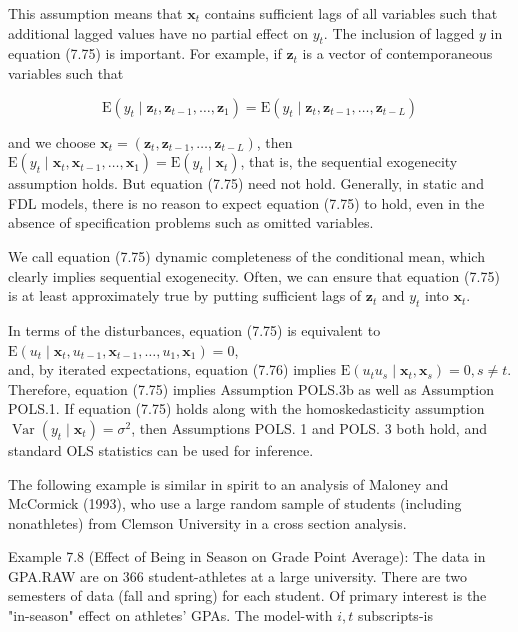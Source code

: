 \documentclass[10pt]{article}
\begin{document}
This assumption means that $\mathbf{x}_{t}$ contains sufficient lags of all variables such that additional lagged values have no partial effect on $y_{t}$. The inclusion of lagged $y$ in equation (7.75) is important. For example, if $\mathbf{z}_{t}$ is a vector of contemporaneous variables such that

$$
\mathrm{E}\left(y_{t} \mid \mathbf{z}_{t}, \mathbf{z}_{t-1}, \ldots, \mathbf{z}_{1}\right)=\mathrm{E}\left(y_{t} \mid \mathbf{z}_{t}, \mathbf{z}_{t-1}, \ldots, \mathbf{z}_{t-L}\right)
$$

and we choose $\mathbf{x}_{t}=\left(\mathbf{z}_{t}, \mathbf{z}_{t-1}, \ldots, \mathbf{z}_{t-L}\right)$, then $\mathrm{E}\left(y_{t} \mid \mathbf{x}_{t}, \mathbf{x}_{t-1}, \ldots, \mathbf{x}_{1}\right)=\mathrm{E}\left(y_{t} \mid \mathbf{x}_{t}\right)$, that is, the sequential exogenecity assumption holds. But equation (7.75) need not hold. Generally, in static and FDL models, there is no reason to expect equation (7.75) to hold, even in the absence of specification problems such as omitted variables.

We call equation (7.75) dynamic completeness of the conditional mean, which clearly implies sequential exogenecity. Often, we can ensure that equation (7.75) is at least approximately true by putting sufficient lags of $\mathbf{z}_{t}$ and $y_{t}$ into $\mathbf{x}_{t}$.

In terms of the disturbances, equation (7.75) is equivalent to\\
$\mathrm{E}\left(u_{t} \mid \mathbf{x}_{t}, u_{t-1}, \mathbf{x}_{t-1}, \ldots, u_{1}, \mathbf{x}_{1}\right)=0$,\\
and, by iterated expectations, equation (7.76) implies $\mathrm{E}\left(u_{t} u_{s} \mid \mathbf{x}_{t}, \mathbf{x}_{s}\right)=0, s \neq t$. Therefore, equation (7.75) implies Assumption POLS.3b as well as Assumption POLS.1. If equation (7.75) holds along with the homoskedasticity assumption $\operatorname{Var}\left(y_{t} \mid \mathbf{x}_{t}\right)=\sigma^{2}$, then Assumptions POLS. 1 and POLS. 3 both hold, and standard OLS statistics can be used for inference.

The following example is similar in spirit to an analysis of Maloney and McCormick (1993), who use a large random sample of students (including nonathletes) from Clemson University in a cross section analysis.

Example 7.8 (Effect of Being in Season on Grade Point Average): The data in GPA.RAW are on 366 student-athletes at a large university. There are two semesters of data (fall and spring) for each student. Of primary interest is the "in-season" effect on athletes' GPAs. The model-with $i, t$ subscripts-is
\end{document}
